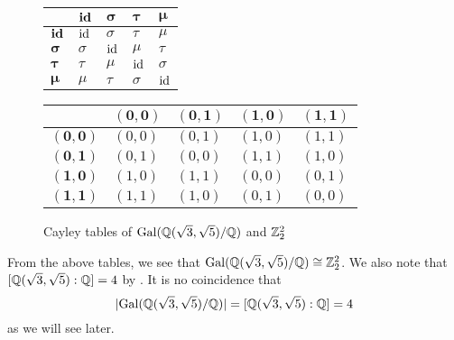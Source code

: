 \begin{example}
    \begin{figure}[H]
        \begin{minipage}[c]{0.475\textwidth}
            \begin{table}[H]
                \centering
                \begin{tabular}{|l|l|l|l|l|}
                    \hline
                    & $\boldsymbol{\mathrm{id}}$ & $\boldsymbol{\sigma}$ & $\boldsymbol{\tau}$ & $\boldsymbol{\mu}$ \\ \hline
                    $\boldsymbol{\mathrm{id}}$ & $\mathrm{id}$ & $\sigma$ & $\tau$ & $\mu$ \\ \hline
                    $\boldsymbol{\sigma}$ & $\sigma$ & $\mathrm{id}$ & $\mu$ & $\tau$ \\ \hline
                    $\boldsymbol{\tau}$ & $\tau$ & $\mu$ & $\mathrm{id}$ & $\sigma$ \\ \hline
                    $\boldsymbol{\mu}$ & $\mu$ & $\tau$ & $\sigma$ & $\mathrm{id}$ \\ \hline
                \end{tabular}
            \end{table}
        \end{minipage}
        \begin{minipage}[c]{0.475\textwidth}
            \begin{table}[H]
                \centering
                \begin{tabular}{|l|l|l|l|l|}
                    \hline
                    & $\boldsymbol{(0, 0)}$ & $\boldsymbol{(0, 1)}$ & $\boldsymbol{(1, 0)}$ & $\boldsymbol{(1, 1)}$ \\ \hline
                    $\boldsymbol{(0, 0)}$ & $(0, 0)$ & $(0, 1)$ & $(1, 0)$ & $(1, 1)$ \\ \hline
                    $\boldsymbol{(0, 1)}$ & $(0, 1)$ & $(0, 0)$ & $(1, 1)$ & $(1, 0)$ \\ \hline
                    $\boldsymbol{(1, 0)}$ & $(1, 0)$ & $(1, 1)$ & $(0, 0)$ & $(0, 1)$ \\ \hline
                    $\boldsymbol{(1, 1)}$ & $(1, 1)$ & $(1, 0)$ & $(0, 1)$ & $(0, 0)$ \\ \hline
                \end{tabular}
            \end{table}
        \end{minipage}
        \caption{Cayley tables of $\mathrm{Gal}(\mathbb{Q}(\sqrt3,\sqrt5)/\mathbb{Q})$ and $\mathbb{Z}_2^2$}
    \end{figure}

    From the above tables, we see that $\mathrm{Gal}(\mathbb{Q}(\sqrt3,\sqrt5)/\mathbb{Q}) \cong \mathbb{Z}_2^2$. We also note that $[\mathbb{Q}(\sqrt3,\sqrt5):\mathbb{Q}] = 4$ by . It is no coincidence that
    \[
        |\mathrm{Gal}(\mathbb{Q}(\sqrt3,\sqrt5)/\mathbb{Q})| = [\mathbb{Q}(\sqrt3,\sqrt5):\mathbb{Q}] = 4
    \]
    as we will see later.
\end{example}

